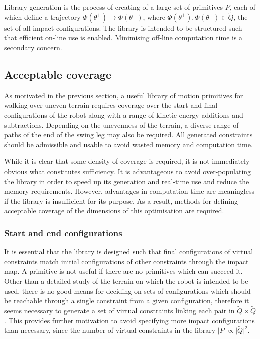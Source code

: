 Library generation is the process of creating of a large set of primitives $P$, each of which define a trajectory $\Phi(\theta^+) \to \Phi(\theta^-)$, where $\Phi(\theta^+), \Phi(\theta^-) \in \tilde{Q}$, the set of all impact configurations. The library is intended to be structured such that efficient on-line use is enabled. Minimising off-line computation time is a secondary concern.

\subsection{Acceptable coverage}
As motivated in the previous section, a useful library of motion primitives for walking over uneven terrain requires coverage over the start and final configurations of the robot along with a range of kinetic energy additions and subtractions. Depending on the unevenness of the terrain, a diverse range of paths of the end of the swing leg may also be required. All generated constraints should be admissible and usable to avoid wasted memory and computation time.

While it is clear that some density of coverage is required, it is not immediately obvious what constitutes sufficiency. It is advantageous to avoid over-populating the library in order to speed up its generation and real-time use and reduce the memory requirements. However, advantages in computation time are meaningless if the library is insufficient for its purpose. As a result, methods for defining acceptable coverage of the dimensions of this optimisation are required.

\subsubsection{Start and end configurations}
It is essential that the library is designed such that final configurations of virtual constraints match initial configurations of other constraints through the impact map. A primitive is not useful if there are no primitives which can succeed it. Other than a detailed study of the terrain on which the robot is intended to be used, there is no good means for deciding on sets of configurations which should be reachable through a single constraint from a given configuration, therefore it seems necessary to generate a set of virtual constraints linking each pair in $\tilde{Q}\times\tilde{Q}$. This provides further motivation to avoid specifying more impact configurations than necessary, since the number of virtual constraints in the library $\lvert P \rvert \propto \lvert\tilde{Q}\rvert^2$.

